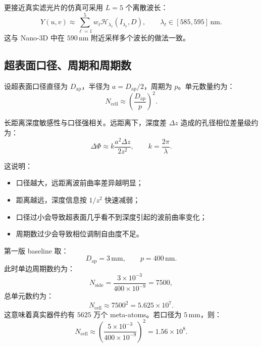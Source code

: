\documentclass[11pt,a4paper,fontset=none]{ctexart}
\begin{document}
更接近真实滤光片的仿真可采用 $L=5$ 个离散波长：
\begin{equation}
  Y(u,v)
  \approx
  \sum_{\ell=1}^{5}
  w_\ell
  \mathcal H_{\lambda_\ell}(I_{\lambda_\ell},D),
  \qquad
  \lambda_\ell\in[585,595]\,\mathrm{nm}.
\end{equation}
这与 Nano-3D 中在 $590\,\mathrm{nm}$ 附近采样多个波长的做法一致。

\subsection{超表面口径、周期和周期数}

设超表面口径直径为 $D_{\mathrm{ap}}$，半径为 $a=D_{\mathrm{ap}}/2$，周期为 $p$。单元数量约为：
\begin{equation}
  N_{\mathrm{cell}}
  \approx
  \left(\frac{D_{\mathrm{ap}}}{p}\right)^2.
\end{equation}

长距离深度敏感性与口径强相关。远距离下，深度差 $\Delta z$ 造成的孔径相位差量级约为：
\begin{equation}
  \Delta\Phi
  \approx
  k\frac{a^2\Delta z}{2z^2},
  \qquad k=\frac{2\pi}{\lambda}.
\end{equation}

这说明：
\begin{itemize}
  \item 口径越大，远距离波前曲率差异越明显；
  \item 距离越远，深度信息按 $1/z^2$ 快速减弱；
  \item 口径过小会导致超表面几乎看不到深度引起的波前曲率变化；
  \item 周期数过少会导致相位调制自由度不足。
\end{itemize}

第一版 baseline 取：
\begin{equation}
  D_{\mathrm{ap}}=3\,\mathrm{mm},\qquad p=400\,\mathrm{nm}.
\end{equation}
此时单边周期数约为：
\begin{equation}
  N_{\mathrm{side}}=
  \frac{3\times10^{-3}}{400\times10^{-9}}
  =
  7500,
\end{equation}
总单元数约为：
\begin{equation}
  N_{\mathrm{cell}}\approx 7500^2=5.625\times10^7.
\end{equation}
这意味着真实器件约有 $5625$ 万个 meta-atoms。若口径为 $5\,\mathrm{mm}$，则：
\begin{equation}
  N_{\mathrm{cell}}\approx
  \left(\frac{5\times10^{-3}}{400\times10^{-9}}\right)^2
  =
  1.56\times10^8.
\end{equation}
\end{document}
